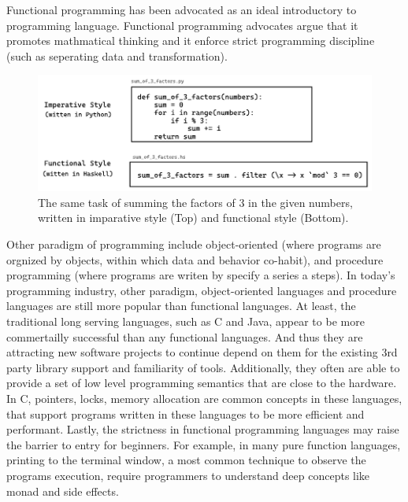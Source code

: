 Functional programming has been advocated as an ideal introductory to programming language. Functional programming advocates argue that it promotes mathmatical thinking and it enforce strict programming discipline (such as seperating data and transformation). 

\begin{figure}[hbt]
  \includegraphics[width=\linewidth]{ImperativeFunctional}
  \caption{
    \label{fig:imperative-vs-functional}
   The same task of summing the factors of 3 in the given numbers, written in imparative style (Top) and functional style (Bottom).
    }
\end{figure}
Other paradigm of programming include object-oriented (where programs are orgnized by objects, within which data and behavior co-habit), and procedure programming (where programs are writen by specify a series a steps). In today's programming industry, other paradigm, object-oriented languages and procedure languages are still more popular than functional languages. At least, the traditional long serving languages, such as C and Java, appear to be more commertailly successful than any functional languages. And thus they are attracting new software projects to continue depend on them for the existing 3rd party library support and familiarity of tools.  Additionally, they often are able to provide a set of low level programming semantics that are close to the hardware. In C, pointers, locks, memory allocation are common concepts in these languages, that support programs written in these languages to be more efficient and performant. Lastly, the strictness in functional programming languages may raise the barrier to entry for beginners. For example, in many pure function languages, printing to the terminal window, a most common technique to observe the programs execution, require programmers to understand deep concepts like monad and side effects.  


